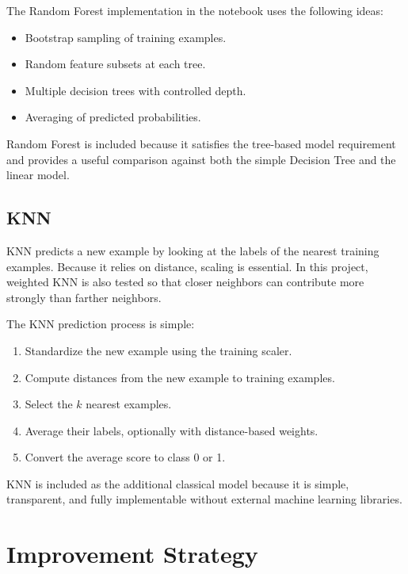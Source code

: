 ﻿\documentclass[12pt,a4paper]{article}
\begin{document}
The Random Forest implementation in the notebook uses the following ideas:

\begin{itemize}
    \item Bootstrap sampling of training examples.
    \item Random feature subsets at each tree.
    \item Multiple decision trees with controlled depth.
    \item Averaging of predicted probabilities.
\end{itemize}

Random Forest is included because it satisfies the tree-based model requirement and provides a useful comparison against both the simple Decision Tree and the linear model.

\clearpage

\subsection{KNN}

KNN predicts a new example by looking at the labels of the nearest training examples. Because it relies on distance, scaling is essential. In this project, weighted KNN is also tested so that closer neighbors can contribute more strongly than farther neighbors.

The KNN prediction process is simple:

\begin{enumerate}
    \item Standardize the new example using the training scaler.
    \item Compute distances from the new example to training examples.
    \item Select the \(k\) nearest examples.
    \item Average their labels, optionally with distance-based weights.
    \item Convert the average score to class 0 or 1.
\end{enumerate}

KNN is included as the additional classical model because it is simple, transparent, and fully implementable without external machine learning libraries.

\clearpage

\section{Improvement Strategy}
\end{document}

